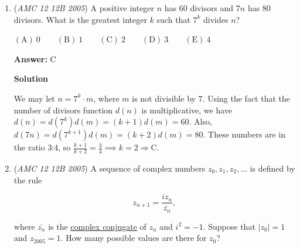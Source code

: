 \begin{enumerate}
 Case 2: $a,b,c,d$ has 20.

 The minimum sum of the 2 even numbers are 20 + 0 = 20 and the minimum sum of the 2 odd numbers are 5 + 9 = 14. This is already greater than the 32 we need.

 We have proven that we cannot partition the 8 numbers into two groups of 4 with the same sum, so the smallest value is $\boxed{C}$.

 



\textbf{Solution 3}

Apply Cauchy's inequality to bound the sum, yielding $(1+1)\left((a+b+c+d)^{2}+(e+f+g+h)^{2}\right) \ge (a+b+c+d+e+f+g+h)^2$ and rearrange to get $(a+b+c+d)^{2}+(e+f+g+h)^{2} \ge 32$, where equality is attained iff $\frac{a+b+c+d}{1}=\frac{e+f+g+h}{1}=4$, which is impossible from the numbers given upon observing. Therefore, we can eliminate choices $\mathrm{(A)}$ and $\mathrm{(B)}$. Now experiment to get that $13-7-5+2$ and $6-3-2+4$ give $34$, which must be the minimum since we've eliminated the smaller answer choices. $\implies \boxed{\mathrm{C}}$



	\item (\textit{AMC 12 12B 2005}) A positive integer $n$ has $60$ divisors and $7n$ has $80$ divisors.  What is the greatest integer $k$ such that $7^k$ divides $n$?


 $\mathrm{(A)}\ {{{0}}} \qquad \mathrm{(B)}\ {{{1}}} \qquad \mathrm{(C)}\ {{{2}}} \qquad \mathrm{(D)}\ {{{3}}} \qquad \mathrm{(E)}\ {{{4}}}$

 \textbf{Answer: }C



\textbf{Solution}

We may let $n = 7^k \cdot m$, where $m$ is not divisible by 7. Using the fact that the number of divisors function $d(n)$ is multiplicative, we have $d(n) = d(7^k)d(m) = (k+1)d(m) = 60$. Also, $d(7n) = d(7^{k+1})d(m) = (k+2)d(m) = 80$. These numbers are in the ratio 3:4, so $\frac{k+1}{k+2} = \frac{3}{4} \implies k = 2 \Rightarrow \boxed{\mathrm{C}}$.

 


	\item (\textit{AMC 12 12B 2005}) A sequence of complex numbers $z_{0}, z_{1}, z_{2}, ...$ is defined by the rule


 
 \[z_{n+1} = \frac {iz_{n}}{\overline {z_{n}}},\]


 where $\overline {z_{n}}$ is the \href{https://artofproblemsolving.com/wiki/index.php?title=Complex\_conjugate}{complex conjugate} of $z_{n}$ and $i^{2}=-1$. Suppose that $|z_{0}|=1$ and $z_{2005}=1$. How many possible values are there for $z_{0}$?



\end{enumerate}
